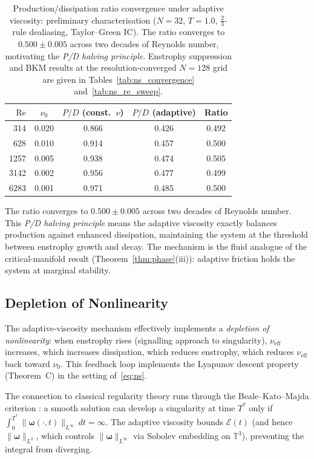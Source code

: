 \documentclass[final]{siamltex}
\newcommand{\T}{\mathbb{T}}
\newcommand{\norm}[1]{\lVert #1 \rVert}
\begin{document}
\begin{table}[htbp]
\centering
\caption{Production/dissipation ratio convergence under adaptive
viscosity: preliminary characterisation ($N=32$, $T=1.0$,
$\tfrac{2}{3}$-rule dealiasing, Taylor--Green IC).  The ratio
converges to $0.500\pm 0.005$ across two decades of Reynolds
number, motivating the \emph{P/D halving principle}.  Enstrophy
suppression and BKM results at the resolution-converged $N=128$
grid are given in Tables~\ref{tab:ns_convergence}
and~\ref{tab:ns_re_sweep}.}
\label{tab:pd}
\begin{tabular}{@{}rcccc@{}}
\toprule
$\mathrm{Re}$ & $\nu_0$ & $P/D$ (const.\ $\nu$) &
$P/D$ (adaptive) & Ratio\\
\midrule
314   & 0.020 & 0.866 & 0.426 & 0.492\\
628   & 0.010 & 0.914 & 0.457 & 0.500\\
1257  & 0.005 & 0.938 & 0.474 & 0.505\\
3142  & 0.002 & 0.956 & 0.477 & 0.499\\
6283  & 0.001 & 0.971 & 0.485 & 0.500\\
\bottomrule
\end{tabular}
\end{table}

The ratio converges to $0.500\pm 0.005$ across two decades of
Reynolds number. This \emph{P/D halving principle} means the
adaptive viscosity exactly balances production against enhanced
dissipation, maintaining the system at the threshold between
enstrophy growth and decay. The mechanism is the fluid analogue of
the critical-manifold result (Theorem~\ref{thm:phase}(iii)):
adaptive friction holds the system at marginal stability.

\subsection{Depletion of Nonlinearity}\label{sec:ns:depletion}

The adaptive-viscosity mechanism effectively implements a
\emph{depletion of nonlinearity}: when enstrophy rises (signalling
approach to singularity), $\nu_{\mathrm{eff}}$ increases, which
increases dissipation, which reduces enstrophy, which reduces
$\nu_{\mathrm{eff}}$ back toward $\nu_0$. This feedback loop
implements the Lyapunov descent property (Theorem~C) in the setting
of~\eqref{eq:ns}.

The connection to classical regularity theory runs through the
Beale--Kato--Majda criterion \cite{bkm1984}: a smooth solution can
develop a singularity at time $T^*$ only if
$\int_0^{T^*}\norm{\bm{\omega}(\cdot,t)}_{L^\infty}\,dt=\infty$.
The adaptive viscosity bounds $\mathcal{E}(t)$ (and hence
$\norm{\bm{\omega}}_{L^2}$, which controls
$\norm{\bm{\omega}}_{L^\infty}$ via Sobolev embedding on $\T^3$),
preventing the integral from diverging.
\end{document}
